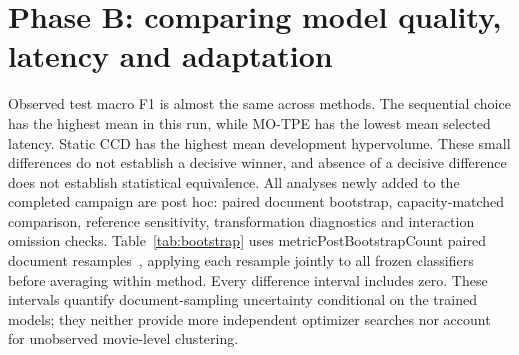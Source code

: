 \documentclass[12pt,a4paper]{article}
\newcommand{\m}[1]{\csname metric#1\endcsname}
\begin{document}
\section{Phase B: comparing model quality, latency and adaptation}
\begin{table}[!htbp]\centering\small\resizebox{\textwidth}{!}{}
\caption{Phase B results. Test metrics average the frozen selected classifier from each search repeat. Development hypervolume summarizes each observed search front under its declared reference. The reported dispersions are sample standard deviations across search repeats. Larger F1 and hypervolume are preferable; smaller log loss and latency are preferable.}\label{tab:bbench}\end{table}
Observed test macro F1 is almost the same across methods. The sequential choice has the highest mean in this run, while MO-TPE has the lowest mean selected latency. Static CCD has the highest mean development hypervolume. These small differences do not establish a decisive winner, and absence of a decisive difference does not establish statistical equivalence.
All analyses newly added to the completed campaign are post hoc: paired document bootstrap, capacity-matched comparison, reference sensitivity, transformation diagnostics and interaction omission checks. Table~\ref{tab:bootstrap} uses \m{PostBootstrapCount} paired document resamples~\cite{bootstrap}, applying each resample jointly to all frozen classifiers before averaging within method. Every difference interval includes zero. These intervals quantify document-sampling uncertainty conditional on the trained models; they neither provide more independent optimizer searches nor account for unobserved movie-level clustering.
\begin{table}[!htbp]\centering\small\resizebox{\textwidth}{!}{}
\caption{Post-hoc paired bootstrap differences in mean test macro F1, with percentile \m{BIntervalLevel}\% bounds. The same documents are resampled jointly for every frozen classifier. These intervals do not test equivalence or quantify uncertainty over future optimizer runs.}\label{tab:bootstrap}\end{table}
\begin{table}[!htbp]\centering\small\resizebox{\textwidth}{!}{}
\caption{All frozen Phase B selections in natural units. Repeat indices are the saved indices. Shared shallow depth does not imply identical settings of the other factors.}\end{table}
\end{document}
